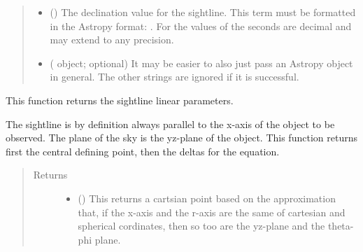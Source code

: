 \documentclass[letterpaper,10pt,english]{sphinxmanual}
\begin{document}
\begin{fulllineitems}
\begin{fulllineitems}
\begin{quote}
\begin{description}
\begin{itemize}
\item {} 
 () \textendash{} The declination value for the sightline. This term must be
formatted in the Astropy  format: .
For the values of the seconds are decimal and may extend to any
precision.

\item {} 
 ( object; optional) \textendash{} It may be easier to also just pass an Astropy
 object in
general. The other strings are ignored if it is successful.

\end{itemize}

\end{description}\end{quote}

\end{fulllineitems}


\begin{fulllineitems}
This function returns the sightline linear parameters.

The sightline is by definition always parallel to the x-axis
of the object to be observed. The plane of the sky is the yz-plane
of the object. This function returns first the central defining
point, then the deltas for the equation.
\begin{quote}\begin{description}
\item[{Returns}] \leavevmode
\begin{itemize}
\item {} 
 () \textendash{} This returns a cartsian point based on the approximation
that, if the x-axis and the r-axis are the same of cartesian
and spherical cordinates, then so too are the yz-plane and the
theta-phi plane.


\end{itemize}
\end{description}
\end{quote}
\end{fulllineitems}
\end{fulllineitems}
\end{document}
